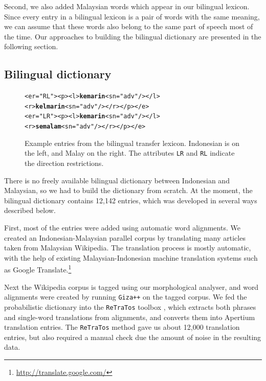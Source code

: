 \documentclass[10pt,a5paper,twoside]{article}
\begin{document}
Second, we also added Malaysian words which appear in our bilingual lexicon. Since every entry in a bilingual lexicon is a pair of words with the same meaning, we can assume that these words also belong to the same part of speech most of the time. Our approaches to building the bilingual dictionary are presented in the following section.

\subsection{Bilingual dictionary}

\begin{figure}[htbp]
\begin{center}
\begin{small}
\begin{alltt}
<e r="RL"><p><l>\textbf{kemarin}<s n="adv"/></l>
             <r>\textbf{kelmarin}<s n="adv"/></r></p></e>
<e r="LR"><p><l>\textbf{kemarin}<s n="adv"/></l>
             <r>\textbf{semalam}<s n="adv"/></r></p></e>
\end{alltt}
\end{small}
\caption{Example entries from the bilingual transfer lexicon. Indonesian is on the left, and Malay on the right. The attributes \texttt{LR} and \texttt{RL} indicate the direction restrictions.}
\label{fig:bidix}
\end{center}
\end{figure}

There is no freely available bilingual dictionary between Indonesian and Malaysian, so we had to build the dictionary from scratch. At the moment, the bilingual dictionary contains 12,142 entries, which was developed in several ways described below.

First, most of the entries were added using automatic word alignments. We created an Indonesian-Malaysian parallel corpus by translating many articles taken from Malaysian Wikipedia. The translation process is mostly automatic, with the help of existing Malaysian-Indonesian machine translation systems such as Google Translate.\footnote{\url{http://translate.google.com/}}

Next the Wikipedia corpus is tagged using our morphological analyser, and word alignments were created by running \texttt{Giza++} \citep{Och2003align} on the tagged corpus. We fed the probabilistic dictionary into the \texttt{ReTraTos} toolbox \citep{Caseli2006retratos}, which extracts both phrases and single-word translations from alignments, and converts them into Apertium translation entries. The \texttt{ReTraTos} method gave us about 12,000 translation entries, but also required a manual check due the amount of noise in the resulting data.
\end{document}

